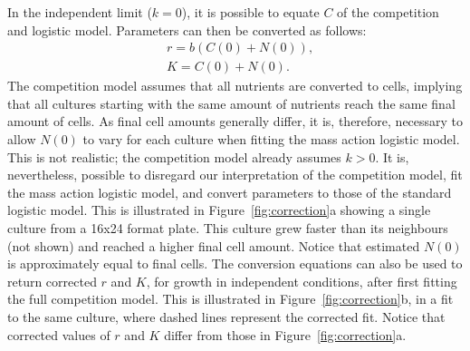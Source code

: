 In the independent limit (\(k=0\)), it is possible to equate \(C\) of
the competition and logistic model. Parameters can then be converted
as follows:
\begin{subequations}
  \label{eq:conversion}
  \begin{align}
    &r = b(C(0) + N(0)),\\
    &K = C(0) + N(0).
  \end{align}
\end{subequations}
%
The competition model assumes that all nutrients are converted to
cells, implying that all cultures starting with the same amount of
nutrients reach the same final amount of cells. As final cell amounts
generally differ, it is, therefore, necessary to allow \(N(0)\) to
vary for each culture when fitting the mass action logistic
model. This is not realistic; the competition model already assumes
\(k>0\). It is, nevertheless, possible to disregard our interpretation
of the competition model, fit the mass action logistic model, and
convert parameters to those of the standard logistic model. This is
illustrated in Figure~\ref{fig:correction}a showing a single culture
from a 16x24 format plate. This culture grew faster than its
neighbours (not shown) and reached a higher final cell amount. Notice
that estimated \(N(0)\) is approximately equal to final cells. The
conversion equations can also be used to return corrected \(r\) and
\(K\), for growth in independent conditions, after first fitting the
full competition model. This is illustrated in
Figure~\ref{fig:correction}b, in a fit to the same culture, where
dashed lines represent the corrected fit.
Notice that corrected values of \(r\) and \(K\) differ from those in
Figure~\ref{fig:correction}a.


